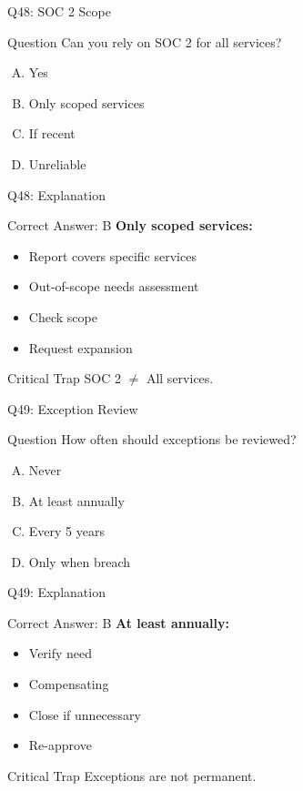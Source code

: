 \documentclass{beamer}
\begin{document}
			\begin{frame}{Q48: SOC 2 Scope}
				\begin{block}{Question}
					Can you rely on SOC 2 for all services?
				\end{block}
				\begin{enumerate}[(A)]
					\item Yes
					\item Only scoped services
					\item If recent
					\item Unreliable
				\end{enumerate}
			\end{frame}
			
			\begin{frame}{Q48: Explanation}
				\begin{block}{Correct Answer: B}
					\textbf{Only scoped services:}
					\begin{itemize}
						\item Report covers specific services
						\item Out-of-scope needs assessment
						\item Check scope
						\item Request expansion
					\end{itemize}
				\end{block}
				\begin{alertblock}{Critical Trap}
					SOC 2 $\neq$ All services.
				\end{alertblock}
			\end{frame}
			
			\begin{frame}{Q49: Exception Review}
				\begin{block}{Question}
					How often should exceptions be reviewed?
				\end{block}
				\begin{enumerate}[(A)]
					\item Never
					\item At least annually
					\item Every 5 years
					\item Only when breach
				\end{enumerate}
			\end{frame}
			
			\begin{frame}{Q49: Explanation}
				\begin{block}{Correct Answer: B}
					\textbf{At least annually:}
					\begin{itemize}
						\item Verify need
						\item Compensating
						\item Close if unnecessary
						\item Re-approve
					\end{itemize}
				\end{block}
				\begin{alertblock}{Critical Trap}
					Exceptions are not permanent.
				\end{alertblock}
			\end{frame}
			
\end{document}
